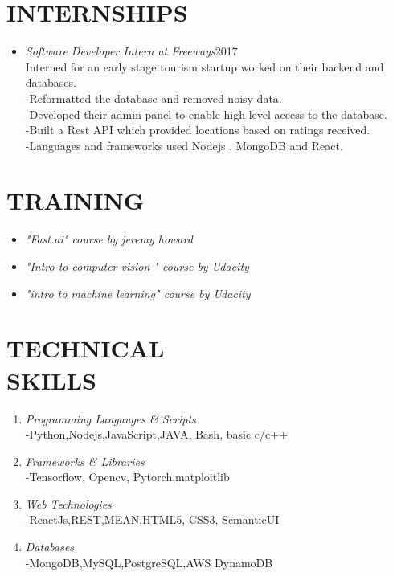 \documentclass[margin]{res}
\begin{document}
\begin{resume}
\section{INTERNSHIPS} \begin{itemize}
 \item{\large{\sl Software Developer Intern at Freeways}}\hfill 2017 \\
 	Interned for an early stage tourism startup worked on their backend and databases.\\
	-Reformatted the database and removed noisy data.\\
	-Developed their admin panel to enable high level access to the database.\\
	-Built a Rest API which  provided locations  based on ratings received.\\
	-Languages and frameworks used Nodejs , MongoDB and React.\\
 \end{itemize}

\section{TRAINING}\begin{itemize}
 \item{\sl  "Fast.ai" course by jeremy howard }
 \item{\sl  "Intro to computer vision " course by Udacity}
 \item{\sl  "intro to machine learning" course by Udacity}
 \end{itemize}

\section{TECHNICAL  \\ SKILLS} \begin{enumerate}
\item {\sl Programming Langauges \& Scripts }\\
	-Python,Nodejs,JavaScript,JAVA, Bash, basic c/c++
\item {\sl Frameworks \& Libraries}\\
	-Tensorflow, Opencv, Pytorch,matploitlib
\item {\sl Web Technologies}\\
	-ReactJs,REST,MEAN,HTML5, CSS3, SemanticUI
\item{\sl Databases}\\
	-MongoDB,MySQL,PostgreSQL,AWS DynamoDB
\end{enumerate}


\end{resume}
\end{document}
